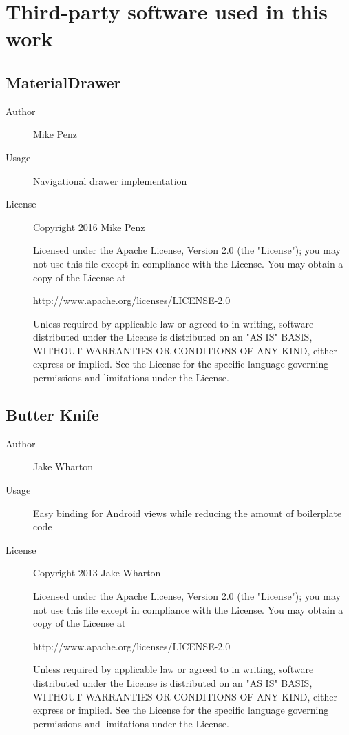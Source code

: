 \chapter{Third-party software used in this work}
\label{chapter:third-party-software}

\section*{MaterialDrawer}
\begin{description}
    \item[Author] Mike Penz
    \item[Usage] Navigational drawer implementation
    \item[License] \scriptsize Copyright 2016 Mike Penz
      
    Licensed under the Apache License, Version 2.0 (the "License");
you may not use this file except in compliance with the License.
You may obtain a copy of the License at

   http://www.apache.org/licenses/LICENSE-2.0

Unless required by applicable law or agreed to in writing, software
distributed under the License is distributed on an "AS IS" BASIS,
WITHOUT WARRANTIES OR CONDITIONS OF ANY KIND, either express or implied.
See the License for the specific language governing permissions and
limitations under the License.
      
\end{description}

\section*{Butter Knife}
\begin{description}
    \item[Author] Jake Wharton
    \item[Usage] Easy binding for Android views while reducing the amount of boilerplate code 
    \item[License] \scriptsize Copyright 2013 Jake Wharton
    
    Licensed under the Apache License, Version 2.0 (the "License");
you may not use this file except in compliance with the License.
You may obtain a copy of the License at

   http://www.apache.org/licenses/LICENSE-2.0

Unless required by applicable law or agreed to in writing, software
distributed under the License is distributed on an "AS IS" BASIS,
WITHOUT WARRANTIES OR CONDITIONS OF ANY KIND, either express or implied.
See the License for the specific language governing permissions and
limitations under the License.
    
\end{description}